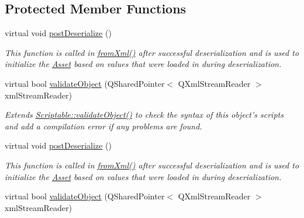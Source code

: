 \subsection*{Protected Member Functions}
\begin{DoxyCompactItemize}
\item 
virtual void \hyperlink{class_picto_1_1_output_element_container_a0aa8ba5d35859292b2f3365f99c242c3}{post\-Deserialize} ()
\begin{DoxyCompactList}\small\item\em This function is called in \hyperlink{class_picto_1_1_asset_a8bed4da09ecb1c07ce0dab313a9aba67}{from\-Xml()} after successful deserialization and is used to initialize the \hyperlink{class_picto_1_1_asset}{Asset} based on values that were loaded in during deserialization. \end{DoxyCompactList}\item 
\hypertarget{class_picto_1_1_output_element_container_a19905a70272fa330d195ed51bfca1a16}{virtual bool \hyperlink{class_picto_1_1_output_element_container_a19905a70272fa330d195ed51bfca1a16}{validate\-Object} (Q\-Shared\-Pointer$<$ Q\-Xml\-Stream\-Reader $>$ xml\-Stream\-Reader)}\label{class_picto_1_1_output_element_container_a19905a70272fa330d195ed51bfca1a16}

\begin{DoxyCompactList}\small\item\em Extends \hyperlink{class_picto_1_1_scriptable_ab6e2944c43a3b5d418bf7b251594386d}{Scriptable\-::validate\-Object()} to check the syntax of this object's scripts and add a compilation error if any problems are found. \end{DoxyCompactList}\item 
virtual void \hyperlink{class_picto_1_1_output_element_container_a7f6fed29af1fe1a08883109f7f685d52}{post\-Deserialize} ()
\begin{DoxyCompactList}\small\item\em This function is called in \hyperlink{class_picto_1_1_asset_a8bed4da09ecb1c07ce0dab313a9aba67}{from\-Xml()} after successful deserialization and is used to initialize the \hyperlink{class_picto_1_1_asset}{Asset} based on values that were loaded in during deserialization. \end{DoxyCompactList}\item 
\hypertarget{class_picto_1_1_output_element_container_a9117dfc9802f1e19e25f75d7f5ef56a1}{virtual bool \hyperlink{class_picto_1_1_output_element_container_a9117dfc9802f1e19e25f75d7f5ef56a1}{validate\-Object} (Q\-Shared\-Pointer$<$ Q\-Xml\-Stream\-Reader $>$ xml\-Stream\-Reader)}\label{class_picto_1_1_output_element_container_a9117dfc9802f1e19e25f75d7f5ef56a1}


\end{DoxyCompactItemize}
